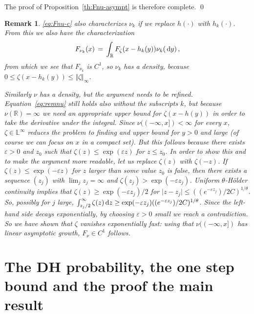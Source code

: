 \documentclass[reqno,11pt]{amsart}
\numberwithin{equation}{section}
\newtheorem{rem}[theorem]{Remark}
\newcommand{\dd}{\,\text{\rm d}}             %
\newcommand{\bbL}{{\ensuremath{\mathbb L}} }
\newcommand{\bbR}{{\ensuremath{\mathbb R}} }
\newcommand{\gep}{\varepsilon}       %
\newcommand{\gz}{\zeta}
\begin{document}
The proof of Proposition~\ref{th:Fnu-asympt} is therefore complete.
\qed

\medskip

\begin{rem}
\label{rem:nu}
 \eqref{eq:Fnu-c} also characterizes $\nu_k$ if we replace $h(\cdot)$ with $h_k(\cdot)$. From this we also have the characterization
\begin{equation}
\label{eq:remnu}
F_{\nu_k}(x)\, =\, \int_ \bbR F_\gz(x-h_k(y)) \nu_k (\dd y)\, ,
\end{equation}
from which we see that $F_{\nu_k}$ is $C^1$, so $\nu_k$ has a density,  because $0 \le \gz(x-h_k(y)) \le \Vert \gz\Vert_\infty$. 

Similarly $\nu$ has a density, but the argument needs to be refined.
Equation~\eqref{eq:remnu} still holds also without the subscripts $k$,
but because $\nu(\bbR)=\infty$
we need an appropriate upper bound for $ \gz(x-h(y))$ in order to take the derivative under the integral. 
Since $\nu((-\infty,x])< \infty$ for every $x$, $\gz \in \bbL^\infty$ reduces the problem to finding and upper bound for $y>0$ and large (of course we can focus on $x$ in a compact set). But this follows because there exists
$\gep>0$ and $z_0$ such that $\gz(z) \le \exp( \gep z)$ for $z \le z_0$. In order to show this 
and  to make the argument  more readable, let us replace $\gz(z)$ with $\gz(-z)$. If $\gz(z) \le \exp( -\gep z)$ for $z$
larger than some value $z_0$ is false, then there exists a sequence  $(z_j)$ with $\lim_j z_j=\infty$ and $\gz(z_j)> \exp(-\gep z_j)$.
Uniform $\theta$-H\"older continuity implies that $\gz(z) \ge  \exp(-\gep z_j)/2$ for $\vert z-z_j\vert \le ((e^{-\gep z_j})/2C)^{1/ \theta}$. So, possibly for $j$ large,  $\int_{z_j/2}^\infty \gz(z) \dd z \ge  \exp(-\gep z_j) ((e^{-\gep z_j})/2C)^{1/ \theta}$.
Since the left-hand side decays exponentially, by choosing $\gep>0$ small we reach a contradiction.
So we have shown that  $\gz$ vanishes exponentially fast: using that  $\nu((-\infty, x])$ has linear asymptotic growth, $F_\nu\in C^1$ follows.
\end{rem}






\section{The DH probability, the one step bound   and the proof the main result}
\label{sec:DH}
\end{document}
